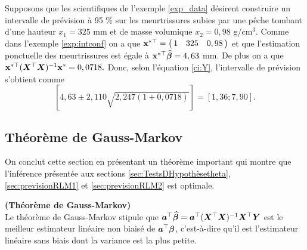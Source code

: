 \begin{exemple}
Supposons que les scientifiques de l'exemple \ref{exp_data} désirent construire un intervalle de prévision à 95 $\%$ sur les meurtrissures subies par une pêche tombant d'une hauteur  $x_1=325$ mm et de masse volumique $x_2=0,98$ g/cm$^3$. Comme dans l'exemple \ref{exp:intconf} on a que $\bold{x}^{*\top}=\left(\!\!
\begin{array}{ccc}
1 & 325 &  0,98
\end{array}
\!\!\right)$
et que l'estimation ponctuelle des meurtrissures est égale à
$\bold{x}^{*\top}\widehat{\bm\beta}=4,63$ mm. De plus on a que $\bold{x}^{*\top}(\bm{X}^\top\bm{X})^{-1}\bold{x}^*=0,0718.$ Donc, selon l'équation \eqref{ci:Y}, l'intervalle de prévision s'obtient comme
$$\left[4,63\pm 2,110\sqrt{2,247(1+0,0718)}\right]=\left[1,36;7,90\right].$$
\end{exemple}



\subsection{Théorème de Gauss-Markov}
\label{sec:ThéorèmeDeGaussMarkov}


On conclut cette section en présentant un théorème important qui montre que l'inférence présentée aux sections \ref{sec:TestsDHypothèsetheta}, \ref{sec:previsionRLM1} et \ref{sec:previsionRLM2} est optimale.

\begin{theorem}\textbf{(Théorème de Gauss-Markov)}\\
Le théorème de Gauss-Markov stipule que $\bm{a}^\top\widehat{\bm\beta} = \bm{a}^\top(\bm{X}^\top\bm{X})^{-1}\bm{X}^\top\bm{Y}$ est le meilleur estimateur linéaire non biaisé de $\bm{a}^\top\bm\beta$, c'est-à-dire qu'il est l'estimateur linéaire sans biais dont la variance est la plus petite.
\end{theorem}


